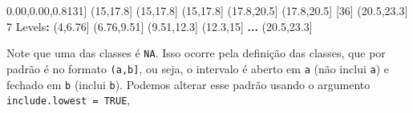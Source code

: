 \documentclass[10pt,a4paper]{book}
\newenvironment{Shaded}{\begin{snugshade}}{\end{snugshade}}
\newcommand{\KeywordTok}[1]{\textcolor[rgb]{0.13,0.29,0.53}{\textbf{#1}}}
\newcommand{\DecValTok}[1]{\textcolor[rgb]{0.00,0.00,0.81}{#1}}
\newcommand{\FloatTok}[1]{\textcolor[rgb]{0.00,0.00,0.81}{#1}}
\newcommand{\StringTok}[1]{\textcolor[rgb]{0.31,0.60,0.02}{#1}}
\newcommand{\OperatorTok}[1]{\textcolor[rgb]{0.81,0.36,0.00}{\textbf{#1}}}
\newcommand{\NormalTok}[1]{#1}
\begin{document}
\begin{Shaded}
\begin{Highlighting}[]
\NormalTok{[}\DecValTok{31}\NormalTok{] (}\DecValTok{15}\NormalTok{,}\FloatTok{17.8}\NormalTok{]   (}\DecValTok{15}\NormalTok{,}\FloatTok{17.8}\NormalTok{]   (}\DecValTok{15}\NormalTok{,}\FloatTok{17.8}\NormalTok{]   (}\FloatTok{17.8}\NormalTok{,}\FloatTok{20.5}\NormalTok{] (}\FloatTok{17.8}\NormalTok{,}\FloatTok{20.5}\NormalTok{]}
\NormalTok{[}\DecValTok{36}\NormalTok{] (}\FloatTok{20.5}\NormalTok{,}\FloatTok{23.3}\NormalTok{]}
\DecValTok{7}\NormalTok{ Levels}\OperatorTok{:}\StringTok{ }\NormalTok{(}\DecValTok{4}\NormalTok{,}\FloatTok{6.76}\NormalTok{] (}\FloatTok{6.76}\NormalTok{,}\FloatTok{9.51}\NormalTok{] (}\FloatTok{9.51}\NormalTok{,}\FloatTok{12.3}\NormalTok{] (}\FloatTok{12.3}\NormalTok{,}\DecValTok{15}\NormalTok{] }\KeywordTok{...}\NormalTok{ (}\FloatTok{20.5}\NormalTok{,}\FloatTok{23.3}\NormalTok{]}
\end{Highlighting}
\end{Shaded}

Note que uma das classes é \texttt{NA}. Isso ocorre pela definição das
classes, que por padrão é no formato \texttt{(a,b{]}}, ou seja, o
intervalo é aberto em \texttt{a} (não inclui \texttt{a}) e fechado em
\texttt{b} (inclui \texttt{b}). Podemos alterar esse padrão usando o
argumento \texttt{include.lowest\ =\ TRUE},
\end{document}
